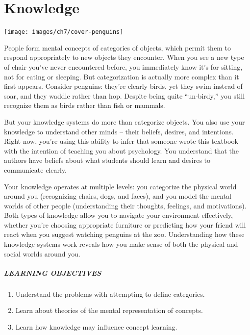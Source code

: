 \documentclass[
]{krantz}
\providecommand{\tightlist}{%
  \setlength{\itemsep}{0pt}\setlength{\parskip}{0pt}}
\begin{document}
\chapter{Knowledge}\label{knowledge}

\begin{center}\texttt{[image: images/ch7/cover-penguins]} \end{center}

People form mental concepts of categories of objects, which permit them to respond appropriately to new objects they encounter. When you see a new type of chair you've never encountered before, you immediately know it's for sitting, not for eating or sleeping. But categorization is actually more complex than it first appears. Consider penguins: they're clearly birds, yet they swim instead of soar, and they waddle rather than hop. Despite being quite ``un-birdy,'' you still recognize them as birds rather than fish or mammals.

But your knowledge systems do more than categorize objects. You also use your knowledge to understand other minds -- their beliefs, desires, and intentions. Right now, you're using this ability to infer that someone wrote this textbook with the intention of teaching you about psychology. You understand that the authors have beliefs about what students should learn and desires to communicate clearly.

Your knowledge operates at multiple levels: you categorize the physical world around you (recognizing chairs, dogs, and faces), and you model the mental worlds of other people (understanding their thoughts, feelings, and motivations). Both types of knowledge allow you to navigate your environment effectively, whether you're choosing appropriate furniture or predicting how your friend will react when you suggest watching penguins at the zoo. Understanding how these knowledge systems work reveals how you make sense of both the physical and social worlds around you.

\paragraph*{LEARNING OBJECTIVES}\label{learning-objectives-6}

\begin{enumerate}
\def\labelenumi{\arabic{enumi}.}
\tightlist
\item
  Understand the problems with attempting to define categories.
\item
  Learn about theories of the mental representation of concepts.
\item
  Learn how knowledge may influence concept learning.
\end{enumerate}
\end{document}
